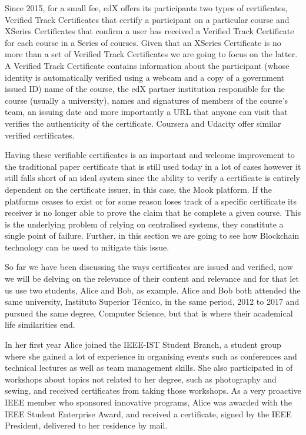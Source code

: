 \documentclass[llncsdoc]{llncs}
\begin{document}
Since 2015, for a small fee, edX offers its participants two types of certificates, Verified Track Certificates that certify a participant on a particular course and XSeries Certificates that confirm a user has received a Verified Track Certificate for each course in a Series of courses. Given that an XSeries Certificate is no more than a set of Verified Track Certificates we are going to focus on the latter. A Verified Track Certificate contains information about the participant (whose identity is automatically verified using a webcam and a copy of a government issued ID) name of the course, the edX partner institution responsible for the course (usually a university), names and signatures of members of the course's team, an issuing date and more importantly a URL that anyone can visit that verifies the authenticity of the certificate. Coursera and Udacity offer similar verified certificates. 

Having these verifiable certificates is an important and welcome improvement to the traditional paper certificate that is still used today in a lot of cases however it still falls short of an ideal system since the ability to verify a certificate is entirely dependent on the certificate issuer, in this case, the Mook platform. If the platforms ceases to exist or for some reason loses track of a specific certificate its receiver is no longer able to prove the claim that he complete a given course. This is the underlying problem of relying on centralised systems, they constitute a single point of failure. Further, in this section we are going to see how Blockchain technology can be used to mitigate this issue.


So far we have been discussing the ways certificates are issued and verified, now we will be delving on the relevance of their content and relevance and for that let us use two students, Alice and Bob, as example. Alice and Bob both attended the same university, Instituto Superior Técnico, in the same period, 2012 to 2017 and pursued the same degree, Computer Science, but that is where their academical life similarities end. 

In her first year Alice joined the IEEE-IST Student Branch, a student group where she gained a lot of experience in organising events such as conferences and technical lectures as well as team management skills. She also participated in of workshops about topics not related to her degree, such as photography and sewing, and received certificates from taking those workshops. As a very proactive IEEE member who sponsored innovative programs, Alice was awarded with the IEEE Student Enterprise Award, and received a certificate, signed by the IEEE President, delivered to her residence by mail.
\end{document}
